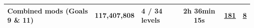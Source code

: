 \begin{frame}{}
\begin{center}
{{\begin{minipage}{480pt}
\begin{tabular}{@{}lllc c c@{}}
\textbf{Combined mods} \textcolor{softgray}{\scriptsize (Goals 9 \& 11)} & 117,407,808 & 4 / 34 levels & 2h 36min 15s & \href{https://luminousrobots.github.io/RoASt-Executions/Exec8_Algo2_Pole_Goals5/viewer.html}{\textcolor{accent}{\textbf{181}}} & \href{https://luminousrobots.github.io/RoASt-Docs/pages/executions.html\#exec8}{\textcolor{accent}{\textbf{8}}} \\
\bottomrule
\end{tabular}
\end{minipage}%
}%
}
\end{center}
\end{frame}
